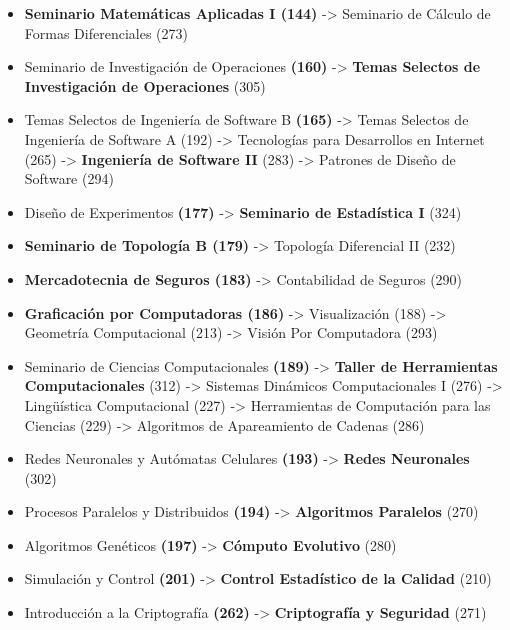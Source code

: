 \begin{appendices}
\begin{enumerate}
\begin{itemize}
  \item \textbf{Seminario Matemáticas Aplicadas I (144)} -> Seminario de Cálculo de Formas Diferenciales (273)
  
  \item Seminario de Investigación de Operaciones \textbf{(160)} -> \textbf{Temas Selectos de Investigación de Operaciones} (305)
  
  \item Temas Selectos de Ingeniería de Software B \textbf{(165)} -> Temas Selectos de Ingeniería de Software A (192) -> Tecnologías para Desarrollos en Internet (265) -> \textbf{Ingeniería de Software II} (283) -> Patrones de Diseño de Software (294)
  
  \item Diseño de Experimentos \textbf{(177)} -> \textbf{Seminario de Estadística I} (324)

  \item \textbf{Seminario de Topología B (179)} -> Topología Diferencial II (232)

  \item \textbf{Mercadotecnia de Seguros (183)} -> Contabilidad de Seguros (290)
  
  \item \textbf{Graficación por Computadoras (186)} -> Visualización (188) -> Geometría Computacional (213) -> Visión Por Computadora (293)
  
  \item Seminario de Ciencias Computacionales \textbf{(189)} -> \textbf{Taller de Herramientas Computacionales} (312) -> Sistemas Dinámicos Computacionales I (276) -> Lingüística Computacional (227) -> Herramientas de Computación para las Ciencias (229) -> Algoritmos de Apareamiento de Cadenas (286)
  
  \item Redes Neuronales y Autómatas Celulares \textbf{(193)} -> \textbf{Redes Neuronales} (302)
  
  \item Procesos Paralelos y Distribuidos \textbf{(194)} -> \textbf{Algoritmos Paralelos} (270)
  
  \item Algoritmos Genéticos \textbf{(197)} -> \textbf{Cómputo Evolutivo} (280)
  
  \item Simulación y Control \textbf{(201)} -> \textbf{Control Estadístico de la Calidad} (210)
  
  \item Introducción a la Criptografía \textbf{(262)} -> \textbf{Criptografía y Seguridad} (271)
  

\end{itemize}
\end{enumerate}
\end{appendices}
